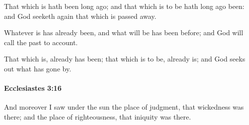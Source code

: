 			\begin{versebox}
					\item[BHS] 
					\item[LXX] 
					\item[ASV] That which is hath been long ago; and that which is to be hath long ago been: and God seeketh again that which is passed away.
					\item[NIV] Whatever is has already been, and what will be has been before; and God will call the past to account.
					\item[NRSV] That which is, already has been; that which is to be, already is; and God seeks out what has gone by.
			\end{versebox}

		\paragraph{Ecclesiastes 3:16} %
			\label{ECCLESIASTES-3-16}

			And moreover I saw under the sun the place of judgment, that wickedness was there; and the place of righteousness, that iniquity was there.

